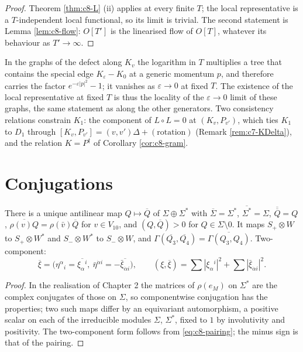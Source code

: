 \begin{proof}
Theorem \ref{thm:c8-L} (ii) applies at every finite $T$; the local representative is a $T$-independent local functional, so its limit is trivial. The second statement is Lemma \ref{lem:c8-flow}: $O[T']$ is the linearised flow of $O[T]$, whatever its behaviour as $T'\to\infty$.
\end{proof}

\begin{remark}
In the graphs of the defect along $K_v$ the logarithm in $T$ multiplies a tree that contains the special edge $K_\varepsilon-K_0$ at a generic momentum $p$, and therefore carries the factor $e^{-\varepsilon|p|^2}-1$; it vanishes as $\varepsilon\to0$ at fixed $T$. The existence of the local representative at fixed $T$ is thus the locality of the $\varepsilon\to0$ limit of these graphs, the same statement as along the other generators. Two consistency relations constrain $K_1$: the component of $L\circ L=0$ at $(K_v,P_{v'})$, which ties $K_1$ to $D_1$ through $[K_v,P_{v'}]=(v,v')\Delta+(\text{rotation})$ (Remark \ref{rem:c7-KDelta}), and the relation $K=P^\dagger$ of Corollary \ref{cor:c8-gram}.
\end{remark}

\section{Conjugations}

\begin{lemma}
\label{lem:c8-cc}
There is a unique antilinear map $Q\mapsto\overline Q$ of $\Sigma\oplus\Sigma^*$ with $\overline\Sigma=\Sigma^*$, $\overline{\Sigma^*}=\Sigma$, $\overline{\overline Q}=Q$, $\overline{\rho(v)Q}=\rho(\bar v)\overline Q$ for $v\in V_{10}$, and $(Q,\overline Q)>0$ for $Q\in\Sigma\setminus0$. It maps $S_+\otimes W$ to $S_+\otimes W^*$ and $S_-\otimes W^*$ to $S_-\otimes W$, and $\Gamma(\overline{Q_3},\overline{Q_4})=\overline{\Gamma(Q_3,Q_4)}$. Two-component:
\begin{equation}
\overline\xi=\big(\eta^\alpha{}_i=\overline{\xi_\alpha{}^i},\ \bar\eta^{\dot\alpha i}=-\overline{\bar\xi_{\dot\alpha i}}\big),\qquad (\xi,\overline\xi)=\sum|\xi_\alpha{}^i|^2+\sum|\bar\xi_{\dot\alpha i}|^2 .
\label{eq:c8-cc}
\end{equation}
\end{lemma}

\begin{proof}
In the realisation of Chapter 2 the matrices of $\rho(e_M)$ on $\Sigma^*$ are the complex conjugates of those on $\Sigma$, so componentwise conjugation has the properties; two such maps differ by an equivariant automorphism, a positive scalar on each of the irreducible modules $\Sigma$, $\Sigma^*$, fixed to $1$ by involutivity and positivity. The two-component form follows from \eqref{eq:c8-pairing}; the minus sign is that of the pairing.
\end{proof}

